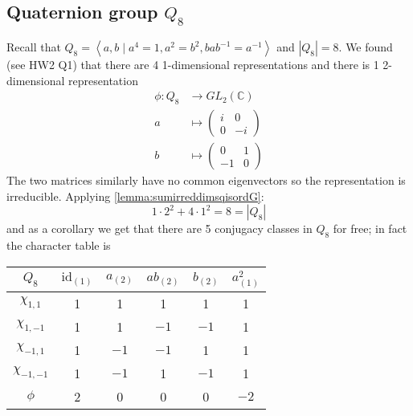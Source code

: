 \documentclass{article}
\newcommand{\la}{\left\langle}
\newcommand{\ra}{\right\rangle}
\newcommand{\C}{\mathbb{C}}
\newcommand{\id}{\text{id}}
\theoremstyle{definition}
\begin{document}
\subsection{Quaternion group $Q_8$}
Recall that $Q_8=\la a,b\mid a^4=1,a^2=b^2,bab^{-1}=a^{-1}\ra$ and $|Q_8|=8$. We found (see HW2 Q1) that there are 4 1-dimensional representations and there is 1 2-dimensional representation
\[
\begin{aligned}
\phi:Q_8&\rightarrow GL_2(\C)\\
a&\mapsto\begin{pmatrix}
i&0\\0&-i
\end{pmatrix}\\
b&\mapsto\begin{pmatrix}
0&1\\-1&0
\end{pmatrix}
\end{aligned}
\]
The two matrices similarly have no common eigenvectors so the representation is irreducible. Applying \ref{lemma:sumirreddimsqisordG}:
\[
1\cdot 2^2+4\cdot 1^2=8=|Q_8|
\]
and as a corollary we get that there are 5 conjugacy classes in $Q_8$ for free; in fact the character table is
\begin{table}[H]
\centering
\begin{tabular}{c|ccccc}
$Q_8$          & $\id_{(1)}$ & $a_{(2)}$ & $ab_{(2)}$ & $b_{(2)}$ & $a^2_{(1)}$ \\ \hline
$\chi_{1,1}$   & 1           & 1         & 1          & 1         & 1           \\
$\chi_{1,-1}$  & 1           & 1         & $-1$       & $-1$      & 1           \\
$\chi_{-1,1}$  & 1           & $-1$      & $-1$       & 1         & 1           \\
$\chi_{-1,-1}$ & 1           & $-1$      & 1          & $-1$      & 1           \\
$\phi$         & 2           & 0         & 0          & 0         & $-2$       
\end{tabular}
\end{table}
\end{document}
